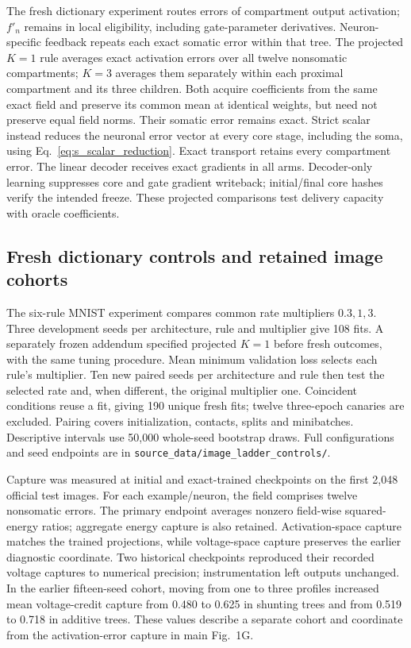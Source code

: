 The fresh dictionary experiment routes errors of compartment output activation; $f'_n$ remains in local eligibility, including gate-parameter derivatives. Neuron-specific feedback repeats each exact somatic error within that tree. The projected $K=1$ rule averages exact activation errors over all twelve nonsomatic compartments; $K=3$ averages them separately within each proximal compartment and its three children. Both acquire coefficients from the same exact field and preserve its common mean at identical weights, but need not preserve equal field norms. Their somatic error remains exact. Strict scalar instead reduces the neuronal error vector at every core stage, including the soma, using Eq.~\ref{eq:s_scalar_reduction}. Exact transport retains every compartment error. The linear decoder receives exact gradients in all arms. Decoder-only learning suppresses core and gate gradient writeback; initial/final core hashes verify the intended freeze. These projected comparisons test delivery capacity with oracle coefficients.

\subsection{Fresh dictionary controls and retained image cohorts}

The six-rule MNIST experiment compares common rate multipliers $0.3,1,3$. Three development seeds per architecture, rule and multiplier give 108 fits. A separately frozen addendum specified projected $K=1$ before fresh outcomes, with the same tuning procedure. Mean minimum validation loss selects each rule's multiplier. Ten new paired seeds per architecture and rule then test the selected rate and, when different, the original multiplier one. Coincident conditions reuse a fit, giving 190 unique fresh fits; twelve three-epoch canaries are excluded. Pairing covers initialization, contacts, splits and minibatches. Descriptive intervals use 50,000 whole-seed bootstrap draws. Full configurations and seed endpoints are in \texttt{source\_data/image\_ladder\_controls/}.

Capture was measured at initial and exact-trained checkpoints on the first 2,048 official test images. For each example/neuron, the field comprises twelve nonsomatic errors. The primary endpoint averages nonzero field-wise squared-energy ratios; aggregate energy capture is also retained. Activation-space capture matches the trained projections, while voltage-space capture preserves the earlier diagnostic coordinate. Two historical checkpoints reproduced their recorded voltage captures to numerical precision; instrumentation left outputs unchanged. In the earlier fifteen-seed cohort, moving from one to three profiles increased mean voltage-credit capture from 0.480 to 0.625 in shunting trees and from 0.519 to 0.718 in additive trees. These values describe a separate cohort and coordinate from the activation-error capture in main Fig.~1G.

